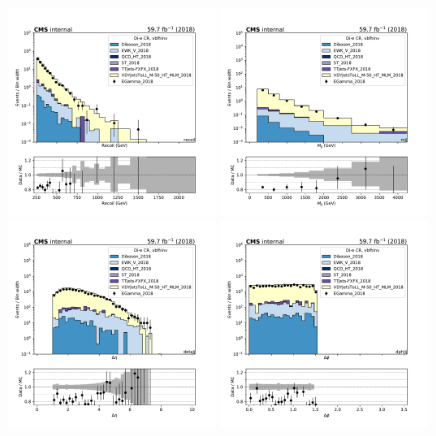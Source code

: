 \begin{figure}[htbp]
    \begin{center}
        \includegraphics[width=0.49\textwidth]{fig/datamc/cr_2e_vbf/cr_2e_vbf_recoil_losf_2018.pdf}
        \includegraphics[width=0.49\textwidth]{fig/datamc/cr_2e_vbf/cr_2e_vbf_mjj_losf_2018.pdf} \\
        \includegraphics[width=0.49\textwidth]{fig/datamc/cr_2e_vbf/cr_2e_vbf_detajj_losf_2018.pdf}
        \includegraphics[width=0.49\textwidth]{fig/datamc/cr_2e_vbf/cr_2e_vbf_dphijj_losf_2018.pdf}

\end{center}
\end{figure}
